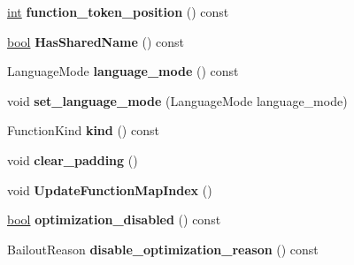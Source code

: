 \begin{DoxyCompactItemize}
\item 
\mbox{\label{classv8_1_1internal_1_1SharedFunctionInfo_a30fe042ca7d8c3874ca95e759e649923}} 
\mbox{\hyperlink{classint}{int}} {\bfseries function\+\_\+token\+\_\+position} () const
\item 
\mbox{\label{classv8_1_1internal_1_1SharedFunctionInfo_a89452e862f7c4c295608f93ab0e1a202}} 
\mbox{\hyperlink{classbool}{bool}} {\bfseries Has\+Shared\+Name} () const
\item 
\mbox{\label{classv8_1_1internal_1_1SharedFunctionInfo_a1508b0f7c775a99604b9b71c264d21e5}} 
Language\+Mode {\bfseries language\+\_\+mode} () const
\item 
\mbox{\label{classv8_1_1internal_1_1SharedFunctionInfo_ae43209f7f1d45525f7c9960a47d21955}} 
void {\bfseries set\+\_\+language\+\_\+mode} (Language\+Mode language\+\_\+mode)
\item 
\mbox{\label{classv8_1_1internal_1_1SharedFunctionInfo_a568c00794e5645962253db5f79adc80a}} 
Function\+Kind {\bfseries kind} () const
\item 
\mbox{\label{classv8_1_1internal_1_1SharedFunctionInfo_aa18272fab1d1d4693a0a22284c4b5647}} 
void {\bfseries clear\+\_\+padding} ()
\item 
\mbox{\label{classv8_1_1internal_1_1SharedFunctionInfo_ac7eb894e717c22dd2da0b0714e47e863}} 
void {\bfseries Update\+Function\+Map\+Index} ()
\item 
\mbox{\label{classv8_1_1internal_1_1SharedFunctionInfo_a1ce9441cfdd3ca71080d4682ee6d34a6}} 
\mbox{\hyperlink{classbool}{bool}} {\bfseries optimization\+\_\+disabled} () const
\item 
\mbox{\label{classv8_1_1internal_1_1SharedFunctionInfo_a6f0f4b9063afb493cd2dcfaab70bef36}} 
Bailout\+Reason {\bfseries disable\+\_\+optimization\+\_\+reason} () const

\end{DoxyCompactItemize}
